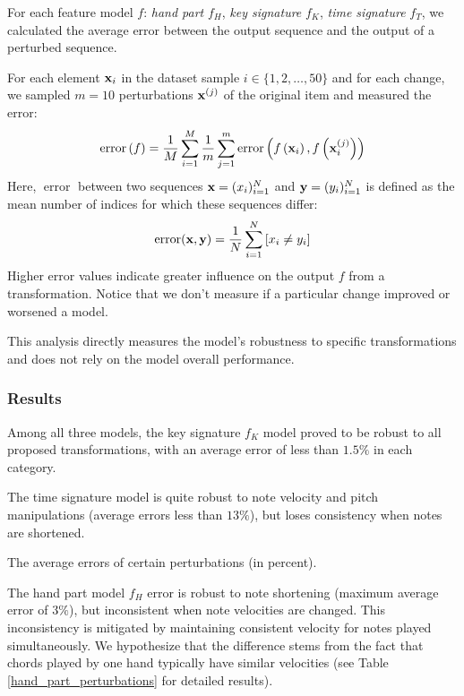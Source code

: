 For each feature model $f$: \emph{hand part} $f_H$, \emph{key signature} $f_K$, \emph{time signature} $f_T$, we calculated the average error between the output sequence and the output of a perturbed sequence.

For each element ${\bf x}_i$ in the dataset sample $i\in\{1,2,\ldots,50\}$ and for each change, we sampled $m=10$ perturbations ${\bf x}^{(j)}$ of the original item and measured the error: \[\operatorname{error}\left(f\right) = \frac{1}{M}\sum_{i=1}^{M}\frac{1}{m}\sum_{j=1}^{m}\operatorname{error}\left(f\left({\bf x}_i\right), f\left({\bf x}_i^{(j)}\right)\right)\] Here, $\operatorname{error}$ between two sequences ${\bf x} = (x_i)_{i=1}^N$ and ${\bf y} = (y_i)_{i=1}^N$ is defined as the mean number of indices for which these sequences differ: \[\operatorname{error}({\bf x},{\bf y}) = \frac{1}{N}\sum_{i=1}^N \left[x_i \neq y_i\right]\] Higher error values indicate greater influence on the output $f$ from a transformation. Notice that we don't measure if a particular change improved or worsened a model.

This analysis directly measures the model's robustness to specific transformations and does not rely on the model overall performance.

\subsubsection{Results} \label{results}

Among all three models, the key signature $f_K$ model proved to be robust to all proposed transformations, with an average error of less than $1.5\%$ in each category.

The time signature model is quite robust to note velocity and pitch manipulations (average errors less than $13\%$), but loses consistency when notes are shortened. \begin{table}[ht!]

\caption{The average errors of certain perturbations (in percent).}
\label{perturbations_errors}
\end{table}

The hand part model $f_H$ error is robust to note shortening (maximum average error of $3\%$), but inconsistent when note velocities are changed. This inconsistency is mitigated by maintaining consistent velocity for notes played simultaneously. We hypothesize that the difference stems from the fact that chords played by one hand typically have similar velocities (see Table \ref{hand_part_perturbations} for detailed results).

